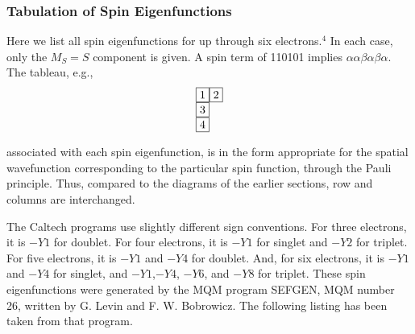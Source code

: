 
\subsubsection{Tabulation of Spin Eigenfunctions}

Here we list all spin eigenfunctions for up through six 
electrons.$^4$  In each case, only the $M_S = S$ component is given.  
A spin term of 110101 implies $\alpha \alpha \beta \alpha \beta 
\alpha$.  The tableau, e.g.,
\begin{equation}
\begin{tabular}{l}
\fbox{1}\fbox{2} \\
\fbox{3} \\
\fbox{4}
\end{tabular}
\end{equation}

\noindent
associated with each spin eigenfunction, is in the form appropriate 
for the spatial wavefunction corresponding to the particular spin 
function, through the Pauli principle.  Thus, compared to the diagrams 
of the earlier sections, row and columns are interchanged.

The Caltech programs use slightly different sign conventions.  For 
three electrons, it is $-Y1$ for doublet.  For four electrons, it is 
$-Y1$ for singlet and $-Y2$ for triplet.  For five electrons, it is 
$-Y1$ and $-Y4$ for doublet.  And, for six
electrons, it is $-Y1$ and $-Y4$ for singlet, and $-Y1$,$ -Y4$, $-Y6$, 
and $-Y8$ for triplet.  These spin eigenfunctions were generated by 
the MQM program SEFGEN, MQM number 26, written by G. Levin and F. 
W. Bobrowicz.  The following listing has been taken from that program.

